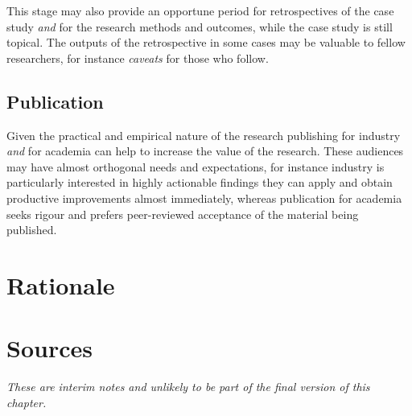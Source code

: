 This stage may also provide an opportune period for retrospectives of the case study \textit{and} for the research methods and outcomes, while the case study is still topical. The outputs of the retrospective in some cases may be valuable to fellow researchers, for instance \emph{caveats} for those who follow. 

\subsection{Publication}
Given the practical and empirical nature of the research publishing for industry \emph{and} for academia can help to increase the value of the research. These audiences may have almost orthogonal needs and expectations, for instance industry is particularly interested in highly actionable findings they can apply and obtain productive improvements almost immediately, whereas publication for academia seeks rigour and prefers peer-reviewed acceptance of the material being published.

\section{Rationale}


\hrulefill
\section{Sources}
\emph{These are interim notes and unlikely to be part of the final version of this chapter.}


